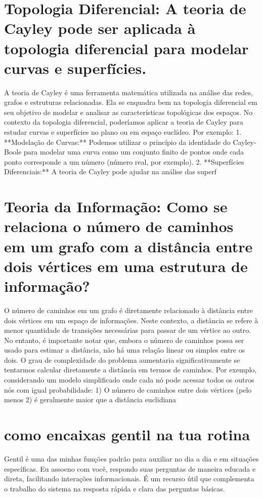 \documentclass[11pt,a4paper]{article}
\begin{document}
\section{Topologia Diferencial: A teoria de Cayley pode ser aplicada à topologia diferencial para modelar curvas e superfícies.}
A teoria de Cayley é uma ferramenta matemática utilizada na análise das redes, grafos e estruturas relacionadas. Ela se enquadra bem na topologia diferencial em seu objetivo de modelar e analisar as características topológicas dos espaços. No contexto da topologia diferencial, poderíamos aplicar a teoria de Cayley para estudar curvas e superfícies no plano ou em espaço euclídeo. Por exemplo: 1. **Modelação de Curvas:** Podemos utilizar o princípio da identidade do Cayley-Boole para modelar uma curva como um conjunto finito de pontos onde cada ponto corresponde a um número (número real, por exemplo). 2. **Superfícies Diferenciais:** A teoria de Cayley pode ajudar na análise das superf

\section{Teoria da Informação: Como se relaciona o número de caminhos em um grafo com a distância entre dois vértices em uma estrutura de informação?}
O número de caminhos em um grafo é diretamente relacionado à distância entre dois vértices em um espaço de informações. Neste contexto, a distância se refere à menor quantidade de transições necessárias para passar de um vértice ao outro. No entanto, é importante notar que, embora o número de caminhos possa ser usado para estimar a distância, não há uma relação linear ou simples entre os dois. O grau de complexidade do problema aumentaria significativamente se tentarmos calcular diretamente a distância em termos de caminhos. Por exemplo, considerando um modelo simplificado onde cada nó pode acessar todos os outros nós com igual probabilidade: 1) O número de caminhos entre dois vértices (pelo menos 2) é geralmente maior que a distância euclidiana

\section{como encaixas gentil na tua rotina}
Gentil é uma das minhas funções padrão para auxiliar no dia a dia e em situações específicas. Eu assoeno com você, respondo suas perguntas de maneira educada e direta, facilitando interações informacionais. É um recurso útil que complementa o trabalho do sistema na resposta rápida e clara das perguntas básicas.
\end{document}
